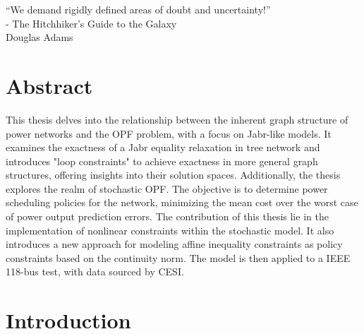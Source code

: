\documentclass[11pt,a4paper,oneside,openany]{book}
\numberwithin{definition}{section}
\numberwithin{theorem}{section}
\numberwithin{problem}{section}
\begin{document}
\begin{footnotesize}
    \frontmatter

\mainmatter
\end{footnotesize}


\begin{flushright}
\addtocounter{page}{1}
    \hspace{1000 mm} 
    
    “We demand rigidly defined areas of doubt and uncertainty!” \\
    \hspace{200mm}
- The Hitchhiker's Guide to the Galaxy \\ Douglas Adams \\ 
\end{flushright}


\newpage
\chapter*{Abstract}

This thesis delves into the relationship between the inherent graph structure of power networks and the OPF problem, with a focus on Jabr-like models. It examines the exactness of a Jabr equality relaxation in tree network and introduces "loop constraints" to achieve exactness in more general graph structures, offering insights into their solution spaces.
Additionally, the thesis explores the realm of stochastic OPF. The objective is to determine power scheduling policies for the network, minimizing the mean cost over the worst case of power output prediction errors. The contribution of this thesis lie in the implementation of nonlinear constraints within the stochastic model. It also introduces a new approach for modeling affine inequality constraints as policy constraints based on the continuity norm. The model is then applied to a IEEE 118-bus test, with data sourced by CESI.

\tableofcontents

\newpage




\chapter*{Introduction}

\end{document}
